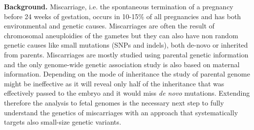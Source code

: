 

\textbf{Background.} Miscarriage, i.e. the spontaneous termination of a pregnancy before 24 weeks of gestation, occurs in  10-15\% of all pregnancies and has both environmental and genetic causes.\cite{larsen2013new,ammon2012systematic, andersen2000maternal} Miscarriages are often the result of chromosomal aneuploidies of the gametes but they can also have non random genetic causes like small mutations (SNPs and indels), both de-novo or inherited from parents. Miscarriages are mostly studied using parental genetic information\cite{pereza2017systematic} %
and the only genome-wide genetic association study is also based on maternal information.\cite{laisk2019genetic} Depending on the mode of inheritance the study of parental genome might be ineffective as it will reveal only half of the inheritance that was effectively passed to the embryo and it would miss \textit{de novo} mutations. Extending therefore the analysis to fetal genomes is the necessary next step to fully understand the genetics of miscarriages with an approach that systematically targets also small-size genetic variants. 


